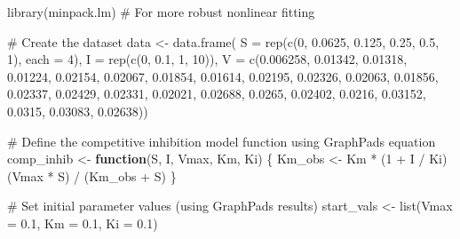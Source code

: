 \documentclass[
  letterpaper,
  DIV=11,
  numbers=noendperiod]{scrreprt}
\newenvironment{Shaded}{\begin{snugshade}}{\end{snugshade}}
\newcommand{\AttributeTok}[1]{\textcolor[rgb]{0.40,0.45,0.13}{#1}}
\newcommand{\CommentTok}[1]{\textcolor[rgb]{0.37,0.37,0.37}{#1}}
\newcommand{\ControlFlowTok}[1]{\textcolor[rgb]{0.00,0.23,0.31}{\textbf{#1}}}
\newcommand{\DecValTok}[1]{\textcolor[rgb]{0.68,0.00,0.00}{#1}}
\newcommand{\FloatTok}[1]{\textcolor[rgb]{0.68,0.00,0.00}{#1}}
\newcommand{\FunctionTok}[1]{\textcolor[rgb]{0.28,0.35,0.67}{#1}}
\newcommand{\NormalTok}[1]{\textcolor[rgb]{0.00,0.23,0.31}{#1}}
\newcommand{\OtherTok}[1]{\textcolor[rgb]{0.00,0.23,0.31}{#1}}
\newcommand{\SpecialCharTok}[1]{\textcolor[rgb]{0.37,0.37,0.37}{#1}}
\begin{document}
\begin{Shaded}
\begin{Highlighting}[]
\FunctionTok{library}\NormalTok{(minpack.lm)  }\CommentTok{\# For more robust nonlinear fitting}

\CommentTok{\# Create the dataset}
\NormalTok{data }\OtherTok{\textless{}{-}} \FunctionTok{data.frame}\NormalTok{(}
  \AttributeTok{S =} \FunctionTok{rep}\NormalTok{(}\FunctionTok{c}\NormalTok{(}\DecValTok{0}\NormalTok{, }\FloatTok{0.0625}\NormalTok{, }\FloatTok{0.125}\NormalTok{, }\FloatTok{0.25}\NormalTok{, }\FloatTok{0.5}\NormalTok{, }\DecValTok{1}\NormalTok{), }\AttributeTok{each =} \DecValTok{4}\NormalTok{),}
  \AttributeTok{I =} \FunctionTok{rep}\NormalTok{(}\FunctionTok{c}\NormalTok{(}\DecValTok{0}\NormalTok{, }\FloatTok{0.1}\NormalTok{, }\DecValTok{1}\NormalTok{, }\DecValTok{10}\NormalTok{)),}
  \AttributeTok{V =} \FunctionTok{c}\NormalTok{(}\FloatTok{0.006258}\NormalTok{, }\FloatTok{0.01342}\NormalTok{, }\FloatTok{0.01318}\NormalTok{, }\FloatTok{0.01224}\NormalTok{,}
        \FloatTok{0.02154}\NormalTok{, }\FloatTok{0.02067}\NormalTok{, }\FloatTok{0.01854}\NormalTok{, }\FloatTok{0.01614}\NormalTok{,}
        \FloatTok{0.02195}\NormalTok{, }\FloatTok{0.02326}\NormalTok{, }\FloatTok{0.02063}\NormalTok{, }\FloatTok{0.01856}\NormalTok{,}
        \FloatTok{0.02337}\NormalTok{, }\FloatTok{0.02429}\NormalTok{, }\FloatTok{0.02331}\NormalTok{, }\FloatTok{0.02021}\NormalTok{,}
        \FloatTok{0.02688}\NormalTok{, }\FloatTok{0.0265}\NormalTok{, }\FloatTok{0.02402}\NormalTok{, }\FloatTok{0.0216}\NormalTok{,}
        \FloatTok{0.03152}\NormalTok{, }\FloatTok{0.0315}\NormalTok{, }\FloatTok{0.03083}\NormalTok{, }\FloatTok{0.02638}\NormalTok{))}

\CommentTok{\# Define the competitive inhibition model function using GraphPad\textquotesingle{}s equation}
\NormalTok{comp\_inhib }\OtherTok{\textless{}{-}} \ControlFlowTok{function}\NormalTok{(S, I, Vmax, Km, Ki) \{}
\NormalTok{  Km\_obs }\OtherTok{\textless{}{-}}\NormalTok{ Km }\SpecialCharTok{*}\NormalTok{ (}\DecValTok{1} \SpecialCharTok{+}\NormalTok{ I }\SpecialCharTok{/}\NormalTok{ Ki)}
\NormalTok{  (Vmax }\SpecialCharTok{*}\NormalTok{ S) }\SpecialCharTok{/}\NormalTok{ (Km\_obs }\SpecialCharTok{+}\NormalTok{ S)}
\NormalTok{\}}

\CommentTok{\# Set initial parameter values (using GraphPad\textquotesingle{}s results)}
\NormalTok{start\_vals }\OtherTok{\textless{}{-}} \FunctionTok{list}\NormalTok{(}\AttributeTok{Vmax =} \FloatTok{0.1}\NormalTok{, }\AttributeTok{Km =} \FloatTok{0.1}\NormalTok{, }\AttributeTok{Ki =} \FloatTok{0.1}\NormalTok{)}


\end{Highlighting}
\end{Shaded}
\end{document}
